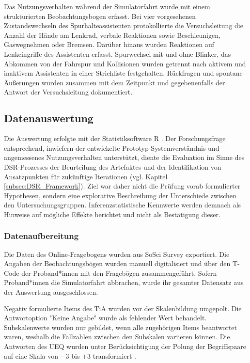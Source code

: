 Das Nutzungsverhalten während der Simulatorfahrt wurde mit einem strukturierten Beobachtungsbogen erfasst. Bei vier vorgesehenen Zustandswechseln des Spurhalteassistenten protokollierte die Versuchsleitung die Anzahl der Hände am Lenkrad, verbale Reaktionen sowie Beschleunigen, Gaswegnehmen oder Bremsen. Darüber hinaus wurden Reaktionen auf Lenkeingriffe des Assistenten erfasst. Spurwechsel mit und ohne Blinker, das Abkommen von der Fahrspur und Kollisionen wurden getrennt nach aktivem und inaktivem Assistenten in einer Strichliste festgehalten. Rückfragen und spontane Äußerungen wurden zusammen mit dem Zeitpunkt und gegebenenfalls der Antwort der Versuchsleitung dokumentiert.

\subsection{Datenauswertung}
\label{subsec:datenauswertung}

Die Auswertung erfolgte mit der Statistiksoftware R \cite{rcore2026}. Der Forschungsfrage entsprechend, inwiefern der entwickelte Prototyp Systemverständnis und angemessenes Nutzungsverhalten unterstützt, diente die Evaluation im Sinne des DSR-Prozesses der Beurteilung des Artefaktes und der Identifikation von Ansatzpunkten für zukünftige Iterationen (vgl. Kapitel \ref{subsec:DSR_Framework}). Ziel war daher nicht die Prüfung vorab formulierter Hypothesen, sondern eine explorative Beschreibung der Unterschiede zwischen den Untersuchungsgruppen. Inferenzstatistische Kennwerte werden demnach als Hinweise auf mögliche Effekte berichtet und nicht als Bestätigung dieser.

\subsubsection{Datenaufbereitung}
\label{subsubsec:datenaufbereitung}

Die Daten des Online-Fragebogens wurden aus SoSci Survey exportiert. Die Angaben der Beobachtungsbögen wurden manuell digitalisiert und über den T-Code der Proband*innen mit den Fragebögen zusammengeführt. Sofern Proband*innen die Simulatorfahrt abbrachen, wurde ihr gesamter Datensatz aus der Auswertung ausgeschlossen.

Negativ formulierte Items des TiA \cite{korber_tia_de} wurden vor der Skalenbildung umgepolt. Die Antwortoption "Keine Angabe" wurde als fehlender Wert behandelt. Subskalenwerte wurden nur gebildet, wenn alle zugehörigen Items beantwortet waren, weshalb die Fallzahlen zwischen den Subskalen variieren können. Die Antworten des UEQ wurden unter Berücksichtigung der Polung der Begriffspaare auf eine Skala von $-3$ bis $+3$ transformiert \cite{laugwitz2008ueq}.

